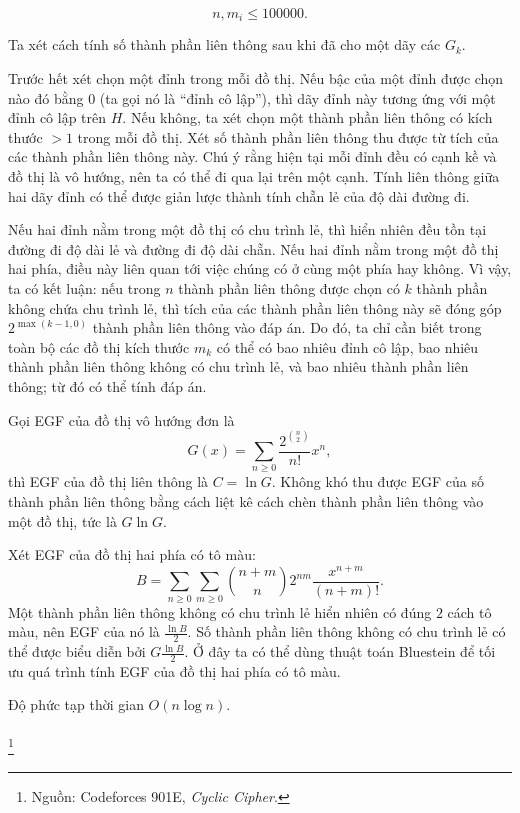 \documentclass[11pt]{article}
\begin{document}
\[
n,m_i\le 100000.
\]

 Ta xét cách tính số thành phần liên thông sau khi đã cho một
dãy các \(G_k\).

Trước hết xét chọn một đỉnh trong mỗi đồ thị. Nếu bậc của một đỉnh được chọn
nào đó bằng \(0\) (ta gọi nó là ``đỉnh cô lập''), thì dãy đỉnh này tương ứng
với một đỉnh cô lập trên \(H\). Nếu không, ta xét chọn một thành phần liên thông
có kích thước \(>1\) trong mỗi đồ thị. Xét số thành phần liên thông thu được từ
tích của các thành phần liên thông này. Chú ý rằng hiện tại mỗi đỉnh đều có
cạnh kề và đồ thị là vô hướng, nên ta có thể đi qua lại trên một cạnh. Tính
liên thông giữa hai dãy đỉnh có thể được giản lược thành tính chẵn lẻ của độ
dài đường đi.

Nếu hai đỉnh nằm trong một đồ thị có chu trình lẻ, thì hiển nhiên đều tồn tại
đường đi độ dài lẻ và đường đi độ dài chẵn. Nếu hai đỉnh nằm trong một đồ thị
hai phía, điều này liên quan tới việc chúng có ở cùng một phía hay không. Vì
vậy, ta có kết luận: nếu trong \(n\) thành phần liên thông được chọn có \(k\)
thành phần không chứa chu trình lẻ, thì tích của các thành phần liên thông này
sẽ đóng góp \(2^{\max(k-1,0)}\) thành phần liên thông vào đáp án. Do đó, ta chỉ
cần biết trong toàn bộ các đồ thị kích thước \(m_k\) có thể có bao nhiêu đỉnh
cô lập, bao nhiêu thành phần liên thông không có chu trình lẻ, và bao nhiêu
thành phần liên thông; từ đó có thể tính đáp án.

Gọi EGF của đồ thị vô hướng đơn là
\[
G(x)=\sum_{n\ge 0}\frac{2^{\binom n2}}{n!}x^n,
\]
thì EGF của đồ thị liên thông là \(C=\ln G\). Không khó thu được EGF của số
thành phần liên thông bằng cách liệt kê cách chèn thành phần liên thông vào một
đồ thị, tức là \(G\ln G\).

Xét EGF của đồ thị hai phía có tô màu:
\[
B=\sum_{n\ge 0}\sum_{m\ge 0}
\binom{n+m}{n}2^{nm}\frac{x^{n+m}}{(n+m)!}.
\]
Một thành phần liên thông không có chu trình lẻ hiển nhiên có đúng \(2\) cách
tô màu, nên EGF của nó là \(\frac{\ln B}{2}\). Số thành phần liên thông không
có chu trình lẻ có thể được biểu diễn bởi \(G\frac{\ln B}{2}\). Ở đây ta có
thể dùng thuật toán Bluestein để tối ưu quá trình tính EGF của đồ thị hai phía
có tô màu.

Độ phức tạp thời gian \(O(n\log n)\).

\paragraph{}\footnote{Nguồn: Codeforces 901E, \emph{Cyclic
Cipher}.}
\end{document}
